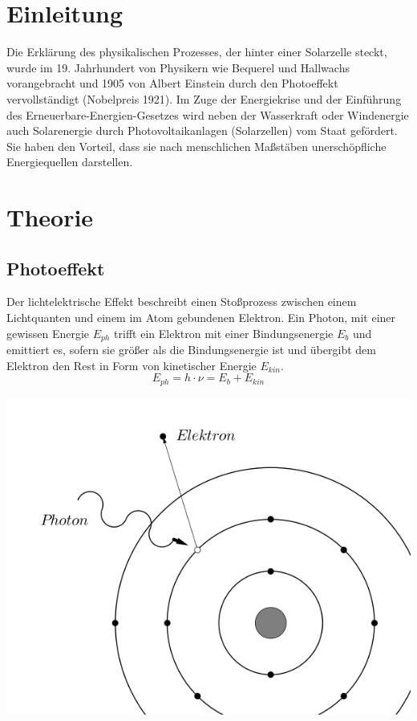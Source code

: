 
\section{Einleitung}				%
Die Erklärung des physikalischen Prozesses, der hinter einer Solarzelle steckt, wurde im 19. Jahrhundert von 
Physikern wie Bequerel und Hallwachs vorangebracht und 1905 von Albert Einstein durch den Photoeffekt vervollständigt (Nobelpreis 1921).
Im Zuge der Energiekrise und der Einführung des Erneuerbare-Energien-Gesetzes wird neben der Wasserkraft oder Windenergie auch Solarenergie durch Photovoltaikanlagen 
(Solarzellen) vom Staat gefördert. Sie haben den Vorteil, dass sie nach menschlichen Maßstäben unerschöpfliche Energiequellen 
darstellen.


\section{Theorie}

\subsection{Photoeffekt}

\begin{minipage}[h]{0.4\textwidth}
Der lichtelektrische Effekt beschreibt einen Stoßprozess zwischen einem Lichtquanten und einem im Atom gebundenen Elektron. Ein Photon,
mit einer gewissen Energie $E_{ph}$ trifft ein Elektron mit einer Bindungsenergie $E_b$ und emittiert es, sofern sie größer als die 
Bindungsenergie ist und übergibt dem Elektron den Rest in Form von kinetischer Energie $E_{kin}$.
\begin{equation}
 E_{ph} = h \cdot \nu = E_{b} + E_{kin}
\end{equation}
\end{minipage}
\begin{minipage}[h]{0.6\textwidth}
  \includegraphics[width=1\textwidth]{pics/sol1.png}
\end{minipage}

